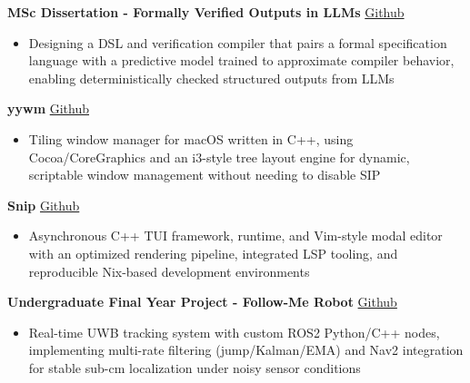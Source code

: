 \documentclass[11pt]{article}
\begin{document}
        
\textbf{MSc Dissertation - Formally Verified Outputs in LLMs}
\hfill \href{https://github.com/ujaandas/dissertation/}{Github} \\
\vspace{-9pt}
\begin{itemize}
    \item Designing a DSL and verification compiler that pairs a formal specification language with a predictive model trained to approximate compiler behavior, enabling deterministically checked structured outputs from LLMs
\end{itemize}

        \vspace{-5pt}
    
        
\textbf{yywm}
\hfill \href{https://github.com/ujaandas/yywm}{Github} \\
\vspace{-9pt}
\begin{itemize}
    \item Tiling window manager for macOS written in C++, using Cocoa/CoreGraphics and an i3-style tree layout engine for dynamic, scriptable window management without needing to disable SIP
\end{itemize}

        \vspace{-5pt}
    
        
\textbf{Snip}
\hfill \href{https://github.com/ujaandas/snip}{Github} \\
\vspace{-9pt}
\begin{itemize}
    \item Asynchronous C++ TUI framework, runtime, and Vim-style modal editor with an optimized rendering pipeline, integrated LSP tooling, and reproducible Nix-based development environments
\end{itemize}

        \vspace{-5pt}
    
        
\textbf{Undergraduate Final Year Project - Follow-Me Robot}
\hfill \href{https://github.com/KnyghtEkkeherd/FinalYearProject}{Github} \\
\vspace{-9pt}
\begin{itemize}
    \item Real-time UWB tracking system with custom ROS2 Python/C++ nodes, implementing multi-rate filtering (jump/Kalman/EMA) and Nav2 integration for stable sub-cm localization under noisy sensor conditions
\end{itemize}
\end{document}
